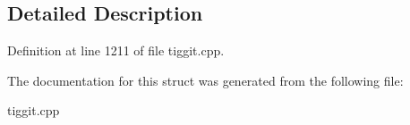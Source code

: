 \subsection{Detailed Description}


Definition at line 1211 of file tiggit.\-cpp.



The documentation for this struct was generated from the following file\-:\begin{DoxyCompactItemize}
\item 
tiggit.\-cpp\end{DoxyCompactItemize}
